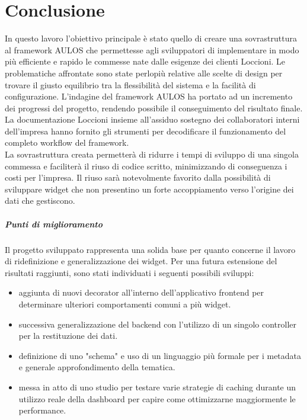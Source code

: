 \chapter{Conclusione}
\label{chap:conclusione}
In questo lavoro l'obiettivo principale è stato quello di creare una sovrastruttura al framework AULOS che permettesse agli sviluppatori di implementare in modo più efficiente e rapido le commesse nate dalle esigenze dei clienti Loccioni. Le problematiche affrontate sono state perlopiù relative alle scelte di design per trovare il giusto equilibrio tra la flessibilità del sistema e la facilità di configurazione. 
L'indagine del framework AULOS ha portato ad un incremento dei progressi del progetto, rendendo possibile il conseguimento del risultato finale. La documentazione Loccioni insieme all'assiduo sostegno dei collaboratori interni dell'impresa hanno fornito gli strumenti per decodificare il funzionamento del completo workflow del framework.
\\
La sovrastruttura creata permetterà di ridurre i tempi di sviluppo di una singola commessa e faciliterà il riuso di codice
scritto, minimizzando di conseguenza i costi per l'impresa. 
Il riuso sarà notevolmente favorito dalla possibilità di sviluppare widget che non presentino un forte accoppiamento verso l'origine dei dati che gestiscono.
\paragraph{Punti di miglioramento}
Il progetto sviluppato rappresenta una solida base per quanto concerne il lavoro di ridefinizione e generalizzazione dei widget. Per una futura estensione del risultati raggiunti, sono stati individuati i seguenti possibili sviluppi:
\begin{itemize}
    \item aggiunta di nuovi decorator all'interno dell'applicativo frontend per determinare ulteriori comportamenti comuni a più widget.
    \item successiva generalizzazione del backend con l'utilizzo di un singolo controller per la restituzione dei dati.
    \item definizione di uno "schema" e uso di un linguaggio più formale per i metadata e generale approfondimento della tematica.
    \item messa in atto di uno studio per testare varie strategie di caching durante un utilizzo reale della dashboard per capire come ottimizzarne maggiormente le performance.
\end{itemize}